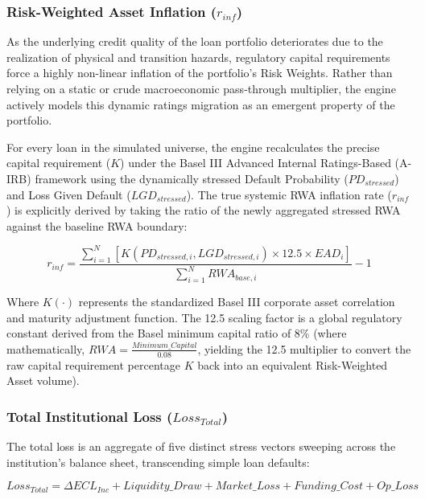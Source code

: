 \documentclass[11pt]{article}
\begin{document}
\subsubsection{Risk-Weighted Asset Inflation ($r_{inf}$)}
As the underlying credit quality of the loan portfolio deteriorates due to the realization of physical and transition hazards, regulatory capital requirements force a highly non-linear inflation of the portfolio's Risk Weights. Rather than relying on a static or crude macroeconomic pass-through multiplier, the engine actively models this dynamic ratings migration as an emergent property of the portfolio.

For every loan in the simulated universe, the engine recalculates the precise capital requirement ($K$) under the Basel III Advanced Internal Ratings-Based (A-IRB) framework using the dynamically stressed Default Probability ($PD_{stressed}$) and Loss Given Default ($LGD_{stressed}$). The true systemic RWA inflation rate ($r_{inf}$) is explicitly derived by taking the ratio of the newly aggregated stressed RWA against the baseline RWA boundary:

\begin{equation}
r_{inf} = \frac{\sum_{i=1}^{N} \left[ K(PD_{stressed,i}, LGD_{stressed,i}) \times 12.5 \times EAD_i \right]}{\sum_{i=1}^{N} RWA_{base,i}} - 1
\end{equation}

Where $K(\cdot)$ represents the standardized Basel III corporate asset correlation and maturity adjustment function. The 12.5 scaling factor is a global regulatory constant derived from the Basel minimum capital ratio of 8\% (where mathematically, $RWA = \frac{Minimum\_Capital}{0.08}$, yielding the 12.5 multiplier to convert the raw capital requirement percentage $K$ back into an equivalent Risk-Weighted Asset volume).

\subsubsection{Total Institutional Loss ($Loss_{Total}$)}
The total loss is an aggregate of five distinct stress vectors sweeping across the institution's balance sheet, transcending simple loan defaults:

\begin{equation}
Loss_{Total} = \Delta ECL_{Inc} + Liquidity\_Draw + Market\_Loss + Funding\_Cost + Op\_Loss
\end{equation}
\end{document}
